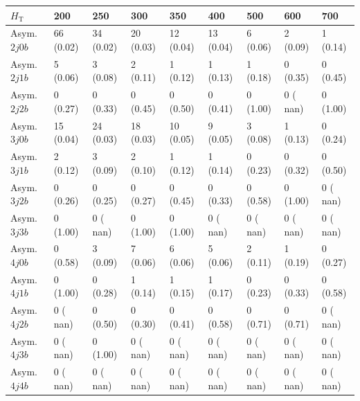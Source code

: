 \begin{table}[h]
\begin{tabular}{lllllllll}
\hline \hline
$H_\textrm{T}$                 &     200 &            250 &             300&             350&             400&             500&             600&             700  \\\hline\hline
Asym. $2j 0b$&     66 (0.02)&	   34 (0.02)&	   20 (0.03)&	   12 (0.04)&	   13 (0.04)&	    6 (0.06)&	    2 (0.09)&	    1 (0.14) \\\hline
Asym. $2j 1b$&      5 (0.06)&	    3 (0.08)&	    2 (0.11)&	    1 (0.12)&	    1 (0.13)&	    1 (0.18)&	    0 (0.35)&	    0 (0.45) \\\hline
Asym. $2j 2b$&      0 (0.27)&	    0 (0.33)&	    0 (0.45)&	    0 (0.50)&	    0 (0.41)&	    0 (1.00)&	    0 ( nan)&	    0 (1.00) \\\hline
Asym. $3j 0b$&     15 (0.04)&	   24 (0.03)&	   18 (0.03)&	   10 (0.05)&	    9 (0.05)&	    3 (0.08)&	    1 (0.13)&	    0 (0.24) \\\hline
Asym. $3j 1b$&      2 (0.12)&	    3 (0.09)&	    2 (0.10)&	    1 (0.12)&	    1 (0.14)&	    0 (0.23)&	    0 (0.32)&	    0 (0.50) \\\hline
Asym. $3j 2b$&      0 (0.26)&	    0 (0.25)&	    0 (0.27)&	    0 (0.45)&	    0 (0.33)&	    0 (0.58)&	    0 (1.00)&	    0 ( nan) \\\hline
Asym. $3j 3b$&      0 (1.00)&	    0 ( nan)&	    0 (1.00)&	    0 (1.00)&	    0 ( nan)&	    0 ( nan)&	    0 ( nan)&	    0 ( nan) \\\hline
Asym. $4j 0b$&      0 (0.58)&	    3 (0.09)&	    7 (0.06)&	    6 (0.06)&	    5 (0.06)&	    2 (0.11)&	    1 (0.19)&	    0 (0.27) \\\hline
Asym. $4j 1b$&      0 (1.00)&	    0 (0.28)&	    1 (0.14)&	    1 (0.15)&	    1 (0.17)&	    0 (0.23)&	    0 (0.33)&	    0 (0.58) \\\hline
Asym. $4j 2b$&      0 ( nan)&	    0 (0.50)&	    0 (0.30)&	    0 (0.41)&	    0 (0.58)&	    0 (0.71)&	    0 (0.71)&	    0 ( nan) \\\hline
Asym. $4j 3b$&      0 ( nan)&	    0 (1.00)&	    0 ( nan)&	    0 ( nan)&	    0 ( nan)&	    0 ( nan)&	    0 ( nan)&	    0 ( nan) \\\hline
Asym. $4j 4b$&      0 ( nan)&	    0 ( nan)&	    0 ( nan)&	    0 ( nan)&	    0 ( nan)&	    0 ( nan)&	    0 ( nan)&	    0 ( nan) \\\hline
\hline              
\end{tabular}
\label{tab:sig_yields_AVDM_asym}
\end{table}





